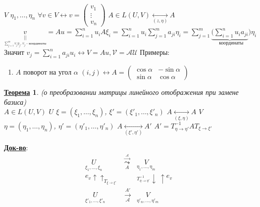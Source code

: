 \documentclass[12pt,a4paper]{article}
\newcommand{\bfline}[1]{\textbf{\underline{#1}}}
\newtheorem*{theorem*}{\bfline{Теорема}}
\begin{document}
$V$ $\eta_1, \ldots, \eta_n$ $\forall v \in V \leftrightarrow v =
	\left(
	\begin{matrix}
	v_1 \\
	\vdots \\
	v_n
	\end{matrix}
	\right)$ \newline
$A \in L(U, V) \underset{(z, \eta)}{\leftrightarrow} A$ \newline
$\underset{\underset{\sum\limits_{j=1}^{m} v_j \eta_j \text{, } v_j \text{ - координаты}}{||}}{v} = Au = \sum\limits_{i=1}^{n} u_i A \xi_i = \sum\limits_{i=1}^{n} u_i \sum\limits_{j=1}^{m} a_{ji} \eta_i = \sum\limits_{j=1}^{m} \underset{\text{координаты}}{\underbrace{(\sum\limits_{i=1}^{n} u_i a_{ji}})} \eta_i$ \newline
Значит $v_j = \sum\limits_{i=1}^{n} a_{ji} u_i \leftrightarrow V = Au, \mathcal{V} = \mathcal{A} \mathcal{U}$ \newline
Примеры:
\begin{enumerate}
	\item $A$ поворот на угол $\alpha$ \newline
		$(i, j) \leftrightarrow A = 
			\left(
			\begin{matrix}
			\cos \alpha & -\sin \alpha \\
			\sin \alpha & \cos \alpha
			\end{matrix}
			\right)$
\end{enumerate}
\begin{theorem*}{(о преобразовании матрицы линейного отображения при замене базиса) \\}
$A \in L(U, V)$ \newline
$U$ $\xi = (\xi_1, \ldots, \xi_n)$, $\xi' = (\xi'_1, \ldots, \xi'_n)$ $A \underset{(\xi, \eta)}{\leftrightarrow} A$ \newline
$V$ $\eta = (\eta_1, \ldots, \eta_n)$, $\eta' = (\eta'_1, \ldots, \eta'_n)$ $A \underset{(\xi', \eta')}{\leftrightarrow} A'$ \newline
$A' = T^{-1}_{\eta \rightarrow \eta'} A T_{\xi \rightarrow \xi'}$
\end{theorem*}
\bfline{Док-во}: \newline
$$\begin{matrix}
\underset{\xi_1, \ldots, \xi_n}{U} & \overset{\overset{\mathcal{A}}{\rightarrow}}{\underset{A}{\leadsto}} & \underset{\eta_1, \ldots, \eta_m}{V} \\
e_v \uparrow \uparrow_{T_{\xi \rightarrow \xi'}} & & _{T^{-1}_{\eta \rightarrow \eta'}} \downarrow \ \uparrow e_v \\
\underset{\xi'_1, \ldots, \xi'_n}{U} & \underset{\mathcal{A}}{\overset{A'}{\rightarrow}} & \underset{\eta'_n, \ldots, \eta'_m}{V}
\end{matrix}$$
\end{document}
